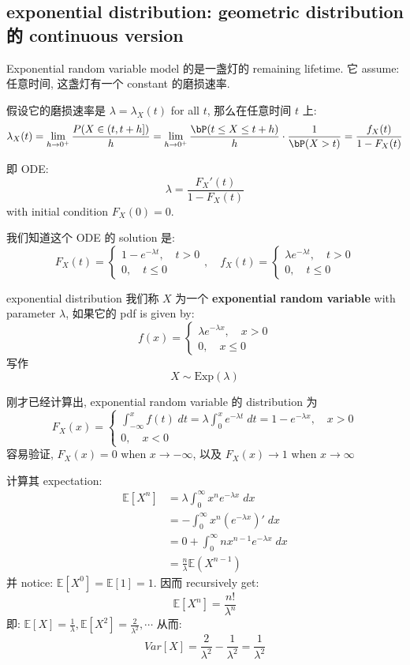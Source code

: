 \subsection{exponential distribution: geometric distribution 的 continuous version}
Exponential random variable model 的是一盏灯的 remaining lifetime. 
它 assume: 任意时间, 这盏灯有一个 constant 的磨损速率.

假设它的磨损速率是 \(\lambda = \lambda_X(t)\) for all \(t\), 
那么在任意时间 \(t\) 上:
\[
\lambda_X(t) = \lim_{h\to 0^+} \frac{P(X \in (t, t+h])}{h} 
= \lim_{h\to0^+}\frac{\bP(t \leq X \leq t+h)}{h}  \cdot \frac{1}{\bP(X > t)}
= \frac{f_X(t)}{1 - F_X(t)}
\]

即 ODE: 
\[
\lambda = \frac{F_X'(t)}{1 - F_X(t)}
\]
with initial condition \(F_X(0) = 0\).

我们知道这个 ODE 的 solution 是: \[
F_X(t) = \begin{cases}
    1 - e^{-\lambda t}, \quad t > 0\\
    0, \quad t \leq 0
\end{cases},
\quad 
f_X(t) = \begin{cases}
    \lambda e^{-\lambda t}, \quad t > 0\\
    0, \quad t \leq 0 
\end{cases}
\]

\begin{definition}{exponential distribution}
我们称 $X$ 为一个 \textbf{exponential random variable} with parameter $\lambda$,
如果它的 pdf is given by: \[
f(x) = \begin{cases}
    \lambda e^{-\lambda x}, \quad x > 0\\
    0, \quad x \leq 0
\end{cases}
\]
写作\[  
X \sim \text{Exp}(\lambda)
\]
\end{definition}
刚才已经计算出, exponential random variable 的
distribution 为\[
F_X(x) = \begin{cases}
    \int _{-\infty}^x f(t) \; dt = \lambda \int_0 ^x e^{-\lambda t} \; dt = 1 - e^{-\lambda x}, \quad x> 0\\
    0,\quad x<0
\end{cases}
\]
容易验证, $F_X(x) =0$ when $x \to -\infty$, 以及 $F_X(x) \to 1$ when $x \to \infty$

计算其 expectation:
\begin{align}
\mathbb{E}[X^n] &= \lambda \int_0^\infty x^n e^{-\lambda x } \; dx  \\
&= - \int_0 ^\infty  x^n(e^{-\lambda x})' \; dx \\
&=  0 + \int_0 ^\infty n x^{n-1} e^{-\lambda x} \; dx \\
&= \frac{n}{\lambda} \mathbb{E}(X^{n-1})
\end{align}
并 notice: $\mathbb{E}[X^0] = \mathbb{E}[1] = 1$. 
因而 recursively get: \[
\mathbb{E}[X^n] = \frac{n!}{\lambda^n}
\]
即: 
\(\mathbb{E}[X] = \frac{1}{\lambda}, \mathbb{E}[X^2] = \frac{2}{\lambda^2}, \cdots  \)
从而: \[
Var[X] = \frac{2}{\lambda^2} - \frac{1}{\lambda^2} = \frac{1}{\lambda^2}
\]

